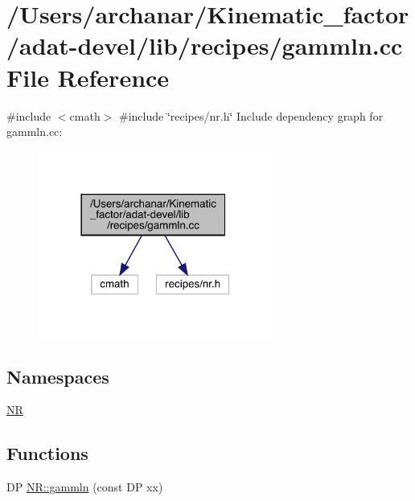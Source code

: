 \hypertarget{adat-devel_2lib_2recipes_2gammln_8cc}{}\section{/\+Users/archanar/\+Kinematic\+\_\+factor/adat-\/devel/lib/recipes/gammln.cc File Reference}
\label{adat-devel_2lib_2recipes_2gammln_8cc}
{\ttfamily \#include $<$cmath$>$}\newline
{\ttfamily \#include \char`\"{}recipes/nr.\+h\char`\"{}}\newline
Include dependency graph for gammln.\+cc\+:
\nopagebreak
\begin{figure}[H]
\begin{center}
\leavevmode
\includegraphics[width=218pt]{d5/d1e/adat-devel_2lib_2recipes_2gammln_8cc__incl}
\end{center}
\end{figure}
\subsection*{Namespaces}
\begin{DoxyCompactItemize}
\item 
 \mbox{\hyperlink{namespaceNR}{NR}}
\end{DoxyCompactItemize}
\subsection*{Functions}
\begin{DoxyCompactItemize}
\item 
DP \mbox{\hyperlink{namespaceNR_aedefa334aaa11250391e7bb4867dc7d5}{N\+R\+::gammln}} (const DP xx)
\end{DoxyCompactItemize}
